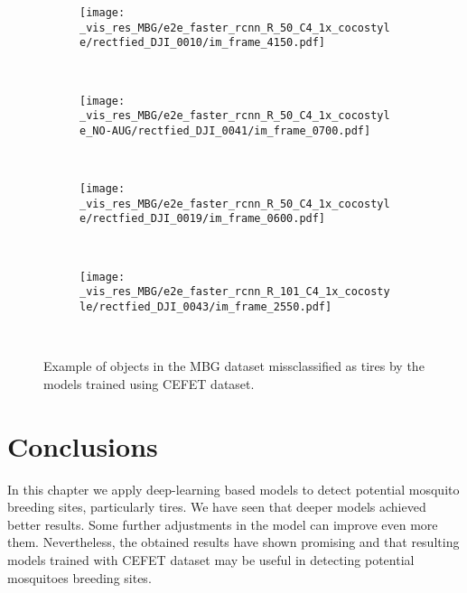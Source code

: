 \begin{figure}[th!]
  \centering
  \begin{subfigure}[t]{.49\linewidth}
    \centering
    \texttt{[image: \_vis\_res\_MBG/e2e\_faster\_rcnn\_R\_50\_C4\_1x\_cocostyle/rectfied\_DJI\_0010/im\_frame\_4150.pdf]}
    \label{fig:mbg_res_50N}
  \end{subfigure}~
  \begin{subfigure}[t]{0.49\linewidth}
    \centering
    \texttt{[image: \_vis\_res\_MBG/e2e\_faster\_rcnn\_R\_50\_C4\_1x\_cocostyle\_NO-AUG/rectfied\_DJI\_0041/im\_frame\_0700.pdf]}
    \label{fig:mbg_res_101}
  \end{subfigure}
  \\
  \vspace{-12mm}
  \begin{subfigure}[t]{0.49\linewidth}
    \centering
    \texttt{[image: \_vis\_res\_MBG/e2e\_faster\_rcnn\_R\_50\_C4\_1x\_cocostyle/rectfied\_DJI\_0019/im\_frame\_0600.pdf]}
    \label{fig:mbg_res_50}
  \end{subfigure}~
  \begin{subfigure}[t]{0.49\linewidth}
    \centering
    \texttt{[image: \_vis\_res\_MBG/e2e\_faster\_rcnn\_R\_101\_C4\_1x\_cocostyle/rectfied\_DJI\_0043/im\_frame\_2550.pdf]}
    \label{fig:mbg_res_101}
  \end{subfigure}\\
  \caption{Example of objects in the MBG dataset missclassified as tires by the models trained using CEFET dataset.}
  \label{fig:mbg_res_fp}
\end{figure}


\section{Conclusions}
%
In this chapter we apply deep-learning based models to detect potential mosquito breeding sites, particularly tires.
We have seen that deeper models achieved better results.
Some further adjustments in the model can improve even more them.
Nevertheless, the obtained results have shown promising and that resulting models trained with CEFET dataset may be useful in detecting potential mosquitoes breeding sites.










